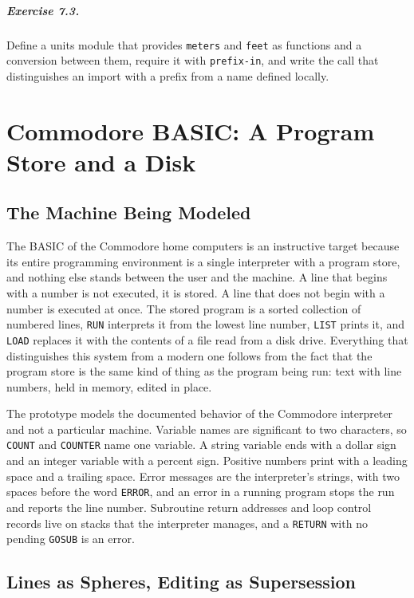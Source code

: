 \paragraph{Exercise 7.3.} Define a units module that provides \texttt{meters} and \texttt{feet} as functions and a conversion between them, require it with \texttt{prefix-in}, and write the call that distinguishes an import with a prefix from a name defined locally.

\chapter{Commodore BASIC: A Program Store and a Disk}

\section{The Machine Being Modeled}

The BASIC of the Commodore home computers is an instructive target because its entire programming environment is a single interpreter with a program store, and nothing else stands between the user and the machine. A line that begins with a number is not executed, it is stored. A line that does not begin with a number is executed at once. The stored program is a sorted collection of numbered lines, \texttt{RUN} interprets it from the lowest line number, \texttt{LIST} prints it, and \texttt{LOAD} replaces it with the contents of a file read from a disk drive. Everything that distinguishes this system from a modern one follows from the fact that the program store is the same kind of thing as the program being run: text with line numbers, held in memory, edited in place.

The prototype models the documented behavior of the Commodore interpreter \cite{c64prg} and not a particular machine. Variable names are significant to two characters, so \texttt{COUNT} and \texttt{COUNTER} name one variable. A string variable ends with a dollar sign and an integer variable with a percent sign. Positive numbers print with a leading space and a trailing space. Error messages are the interpreter's strings, with two spaces before the word \texttt{ERROR}, and an error in a running program stops the run and reports the line number. Subroutine return addresses and loop control records live on stacks that the interpreter manages, and a \texttt{RETURN} with no pending \texttt{GOSUB} is an error.

\section{Lines as Spheres, Editing as Supersession}


